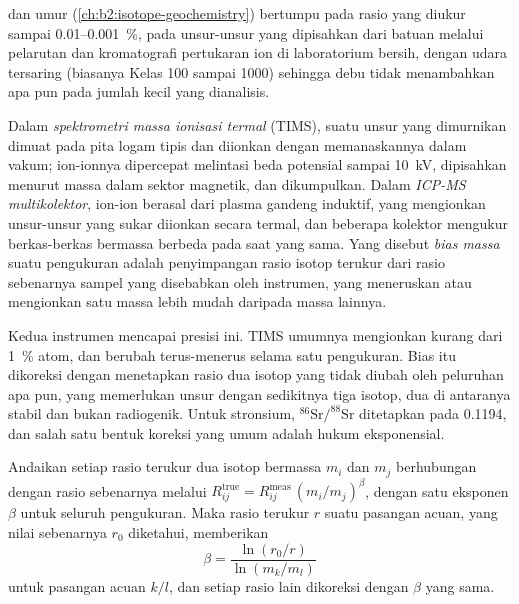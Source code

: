  dan umur (\cref{ch:b2:isotope-geochemistry}) bertumpu pada rasio yang diukur
sampai 0.01--\qty{0.001}{\percent}, pada unsur-unsur yang dipisahkan dari batuan melalui pelarutan
dan kromatografi pertukaran ion di laboratorium bersih, dengan udara tersaring (biasanya Kelas 100 sampai
1000) sehingga debu tidak menambahkan apa pun pada jumlah kecil yang dianalisis.

\begin{definition}\label{def:b2:field-lab-methods-2:tims}
Dalam \emph{spektrometri massa ionisasi termal} (TIMS), suatu
unsur yang dimurnikan dimuat pada pita logam tipis dan diionkan dengan memanaskannya dalam vakum; ion-ionnya
dipercepat melintasi beda potensial sampai \qty{10}{kV}, dipisahkan menurut massa dalam sektor magnetik,
dan dikumpulkan. Dalam \emph{ICP-MS multikolektor}, ion-ion berasal dari
plasma gandeng induktif, yang mengionkan unsur-unsur yang sukar diionkan secara termal, dan beberapa
kolektor mengukur berkas-berkas bermassa berbeda pada saat yang sama. Yang disebut \emph{bias
massa} suatu pengukuran adalah penyimpangan rasio isotop terukur dari rasio
sebenarnya sampel yang disebabkan oleh instrumen, yang meneruskan atau mengionkan satu massa lebih mudah daripada
massa lainnya.
\end{definition}

Kedua instrumen mencapai presisi ini. TIMS umumnya mengionkan kurang dari
\qty{1}{\percent} atom, dan  berubah terus-menerus selama satu pengukuran. Bias itu dikoreksi dengan menetapkan rasio dua isotop yang tidak
diubah oleh peluruhan apa pun, yang memerlukan unsur dengan sedikitnya tiga isotop, dua di antaranya stabil dan bukan
radiogenik. Untuk stronsium, $^{86}\mathrm{Sr}/^{88}\mathrm{Sr}$ ditetapkan pada 0.1194, dan salah satu
bentuk koreksi yang umum adalah hukum eksponensial.

\begin{proposition}\label{prop:b2:field-lab-methods-2:bias}
Andaikan setiap rasio terukur dua isotop bermassa $m_i$ dan $m_j$ berhubungan dengan rasio
sebenarnya melalui $R_{ij}^{\mathrm{true}} = R_{ij}^{\mathrm{meas}}\,(m_i/m_j)^{\beta}$, dengan satu eksponen
$\beta$ untuk seluruh pengukuran. Maka rasio terukur $r$ suatu pasangan acuan, yang nilai sebenarnya
$r_0$ diketahui, memberikan
\begin{equation}
\beta = \frac{\ln(r_0/r)}{\ln(m_k/m_l)}
\label{eq:b2:field-lab-methods-2:beta}
\end{equation}
untuk pasangan acuan $k/l$, dan setiap rasio lain dikoreksi dengan $\beta$ yang sama.
\end{proposition}

